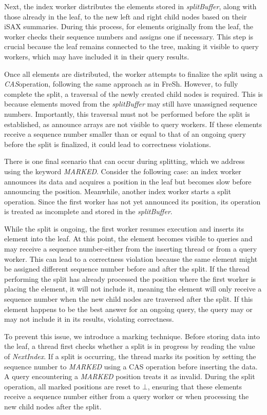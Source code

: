 \documentclass[a4paper,11pt,twoside,openany]{book}
\newcommand{\CAS}{\mbox{\textit{CAS}}}
\begin{document}
Next, the index worker distributes the elements stored in \textit{splitBuffer},
along with those already in the leaf, to the new left and right child nodes
based on their iSAX summaries. During this process, for elements originally
from the leaf, the worker checks their sequence numbers and assigns one
if necessary. This step is crucial because the leaf remains connected to the
tree, making it visible to query workers, which may have included it in their
query results.  

Once all elements are distributed, the worker attempts to finalize the split
using a \CAS operation, following the same approach as in FreSh. However,
to fully complete the split, a traversal of the newly created child nodes
is required. This is because elements moved from the \textit{splitBuffer}
may still have unassigned sequence numbers. Importantly, this traversal must
not be performed before the split is established, as announce arrays are not
visible to query workers. If these elements receive a sequence number smaller
than or equal to that of an ongoing query before the split is finalized,
it could lead to correctness violations. 

There is one final scenario that can occur during splitting, which we address
using the keyword \textit{MARKED}. Consider the following case: an index worker
announces its data and acquires a position in the leaf but becomes slow before
announcing the position. Meanwhile, another index worker starts a split operation.
Since the first worker has not yet announced its position, its operation is treated
as incomplete and stored in the \textit{splitBuffer}.  

While the split is ongoing, the first worker resumes execution and inserts its element
into the leaf. At this point, the element becomes visible to queries and may receive
a sequence number-either from the inserting thread or from a query worker. This can
lead to a correctness violation because the same element might be assigned different
sequence number before and after the split. If the thread performing the split has
already processed the position where the first worker is placing the element,
it will not include it, meaning the element will only receive a sequence number
when the new child nodes are traversed after the split. If this element happens
to be the best answer for an ongoing query, the query may or may not include it in
its results, violating correctness.  

To prevent this issue, we introduce a marking technique. Before storing data into 
the leaf, a thread first checks whether a split is in progress by reading the value
of \textit{NextIndex}. If a split is occurring, the thread marks its position
by setting the sequence number to \textit{MARKED} using a CAS operation before
inserting the data. A query encountering a \textit{MARKED} position treats it as 
invalid. During the split operation, all marked positions are reset to \( \bot \), 
ensuring that these elements receive a sequence number either from a query worker
or when processing the new child nodes after the split.
\end{document}
